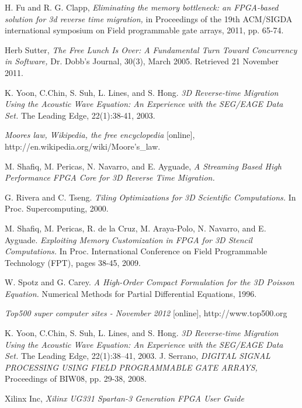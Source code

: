 \begin{thebibliography}{9}
   H. Fu and R. G. Clapp, \emph{Eliminating the memory
    bottleneck: an FPGA-based solution for 3d reverse time migration,}
    in Proceedings of the 19th ACM/SIGDA international symposium on Field
    programmable gate arrays, 2011, pp. 65-74.

   Herb Sutter, \emph{The Free Lunch Is Over: A Fundamental
    Turn Toward Concurrency in Software,} Dr. Dobb's Journal, 30(3), March
    2005. Retrieved 21 November 2011.

   K. Yoon, C.Chin, S. Suh, L. Lines, and S. Hong.
    \emph{3D Reverse-time Migration Using the Acoustic Wave Equation:
    An Experience with the SEG/EAGE Data Set.} The Leading Edge, 22(1):38-41,
    2003.

    \emph{Moores law, Wikipedia, the free encyclopedia} [online],
    http://en.wikipedia.org/wiki/Moore's\_law.

   M. Shafiq, M. Pericas, N. Navarro, and E. Ayguade,
    \emph{A Streaming Based High Performance FPGA Core for 3D Reverse
    Time Migration.}

   G. Rivera and C. Tseng.
    \emph{Tiling Optimizations for 3D Scientific Computations.}
    In Proc. Supercomputing, 2000.

   M. Shafiq, M. Pericas, R. de la Cruz, M. Araya-Polo,
    N. Navarro, and E. Ayguade.
    \emph{Exploiting Memory
    Customization in FPGA for 3D Stencil Computations.}
    In Proc. International Conference on Field
    Programmable Technology (FPT), pages 38-45, 2009.

   W. Spotz and G. Carey.
    \emph{A High-Order Compact Formulation for the 3D Poisson Equation.}
    Numerical Methods for Partial Differential Equations, 1996.

    \emph{Top500 super computer sites - November 2012} [online],
    http://www.top500.org

  K. Yoon, C.Chin, S. Suh, L. Lines, and S. Hong.
    \emph{3D Reverse-time Migration Using the Acoustic Wave
      Equation: An Experience with the SEG/EAGE Data
    Set. }
    The Leading Edge, 22(1):38–41, 2003.
    J. Serrano,
    \emph{DIGITAL SIGNAL PROCESSING USING FIELD PROGRAMMABLE GATE ARRAYS,}
    Proceedings of BIW08, pp. 29-38, 2008.

    Xilinx Inc,
    \emph{Xilinx UG331 Spartan-3 Generation FPGA User Guide}


\end{thebibliography}
